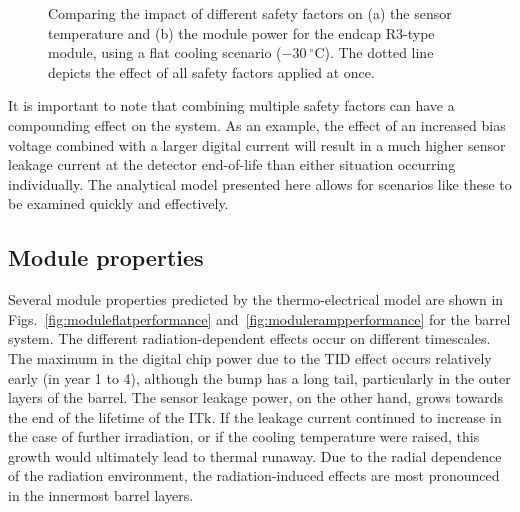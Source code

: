 \begin{figure}[t!]
\centering
{}\quad\quad
{}
\caption{Comparing the impact of different safety factors on (a) the sensor temperature and
(b) the module power for the endcap R3-type module, using a flat cooling scenario ($-30~^\circ$C). The dotted line depicts the effect of all safety
factors applied at once.}
\label{fig:safety_factors}
\end{figure}

It is important to note that combining multiple safety factors can have a compounding effect on the system. As an example, the effect of an increased bias voltage combined with a larger digital current will result in a much higher sensor leakage current at the detector end-of-life than either situation occurring individually. The analytical model presented here allows for scenarios like these to be examined quickly and effectively.

\subsection{Module properties}

Several module properties predicted by the thermo-electrical model are shown in Figs.~\ref{fig:moduleflatperformance} and~\ref{fig:modulerampperformance} for the barrel system. The different radiation-dependent effects occur on different timescales. The maximum in the digital chip power due to the TID effect occurs relatively early (in year 1 to 4), although the bump has a long tail, particularly in the outer layers of the barrel. The sensor leakage power, on the other hand, grows towards the end of the lifetime of the ITk. If the leakage current continued to increase in the case of further irradiation, or if the cooling temperature were raised, this growth would ultimately lead to thermal runaway. Due to the radial dependence of the radiation environment, the radiation-induced effects are most pronounced in the innermost barrel layers.


